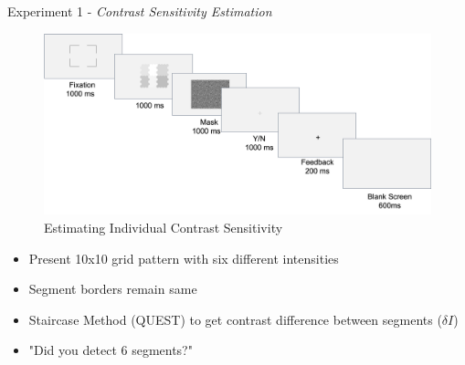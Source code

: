 \documentclass[10pt,xcolor=svgnames]{beamer} %
\begin{document}
\begin{frame}{Experiment 1 - \textit{Contrast Sensitivity Estimation}}
    \begin{figure}
    \centering
        \includegraphics[width = \textwidth]{pictures/thresholdExpProcedure.png}   
    \caption{\footnotesize Estimating Individual Contrast Sensitivity}
    \end{figure}    
    \vspace{-0.5cm}
    \begin{itemize}
        \item Present 10x10 grid pattern with six different intensities
        \item Segment borders remain same
        \item Staircase Method (QUEST) to get contrast difference between segments ($\delta I$)
        \item "Did you detect 6 segments?"
    \end{itemize}
\end{frame}
\end{document}
